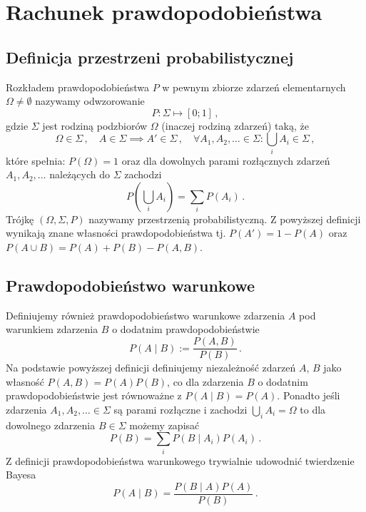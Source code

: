 \documentclass{myclass}
\author{Bartosz Hanc}
\begin{document}
\tableofcontents
\newpage

\section{Rachunek prawdopodobieństwa}

\subsection{Definicja przestrzeni probabilistycznej}

Rozkładem prawdopodobieństwa \(P\) w pewnym zbiorze zdarzeń elementarnych \(\Omega \neq \emptyset\)
nazywamy odwzorowanie
\begin{equation*}
    P: \Sigma \mapsto [0;1]\,,
\end{equation*}
gdzie \(\Sigma\) jest rodziną podzbiorów \(\Omega\) (inaczej rodziną zdarzeń) taką, że
\begin{equation*}
    \Omega \in \Sigma\,,\quad A \in \Sigma \implies A' \in \Sigma\,,\quad \forall A_1, A_2, \ldots \in \Sigma : \bigcup_{i}
    A_i \in \Sigma\,,
\end{equation*}
które spełnia: \(P(\Omega) = 1\) oraz dla dowolnych parami rozłącznych zdarzeń \(A_1, A_2, \ldots\)
należących do \(\Sigma\) zachodzi
\begin{equation*}
    P\left(\bigcup_i A_i\right) = \sum_i P(A_i)\,.
\end{equation*}
Trójkę \((\Omega, \Sigma, P)\) nazywamy przestrzenią probabilistyczną. Z powyższej definicji
wynikają znane własności prawdopodobieństwa tj. \(P(A') = 1 - P(A)\) oraz \(P(A \cup B) = P(A) +
P(B) - P(A , B)\). 

\subsection{Prawdopodobieństwo warunkowe}

Definiujemy również prawdopodobieństwo warunkowe zdarzenia \(A\) pod warunkiem zdarzenia \(B\) o
dodatnim prawdopodobieństwie 
\begin{equation*}
    P(A \mid B) := \frac{P(A , B)}{P(B)}\,.
\end{equation*}
Na podstawie powyższej definicji definiujemy niezależność zdarzeń \(A\), \(B\) jako własność
\(P(A,B) = P(A)P(B)\), co dla zdarzenia \(B\) o dodatnim prawdopodobieństwie jest równoważne z \(P(A
\mid B) = P(A)\). Ponadto jeśli zdarzenia \(A_1, A_2, \ldots \in \Sigma\) są parami rozłączne i
zachodzi \(\bigcup_i A_i = \Omega\) to dla dowolnego zdarzenia \(B \in \Sigma\) możemy zapisać
\begin{equation*}
    P(B) = \sum_i P(B \mid A_i) P(A_i)\,.
\end{equation*}
Z definicji prawdopodobieństwa warunkowego trywialnie udowodnić twierdzenie Bayesa
\begin{equation*}
    P(A \mid B) = \frac{P(B \mid A) P(A)}{P(B)}\,.
\end{equation*}
\end{document}
